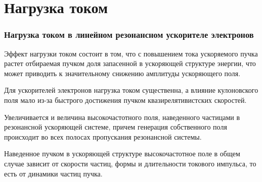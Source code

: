 \section{Нагрузка током}

\begin{frame}
	\frametitle{Нагрузка током в линейном резонансном ускорителе электронов}
	\par Эффект нагрузки током состоит в том, что с повышением тока 
	ускоряемого пучка растет отбираемая пучком доля запасенной в 
	ускоряющей структуре энергии, что может приводить к значительному 
	снижению амплитуды ускоряющего поля.
	\newline
	\par  Для ускорителей электронов нагрузка током существенна, а влияние 
	кулоновского поля мало из-за быстрого достижения пучком 
	квазирелятивистских скоростей.
	\par Увеличивается и величина 
	высокочастотного поля, наведенного частицами в резонансной 
	ускоряющей системе, причем генерация собственного поля происходит во 
	всех полосах пропускания резонансной системы.
	\newline
	\par Наведенное пучком в ускоряющей структуре высокочастотное поле в общем случае зависит от 
	скорости частиц, формы и длительности токового импульса, то есть от 
	динамики частиц пучка.

\end{frame}


